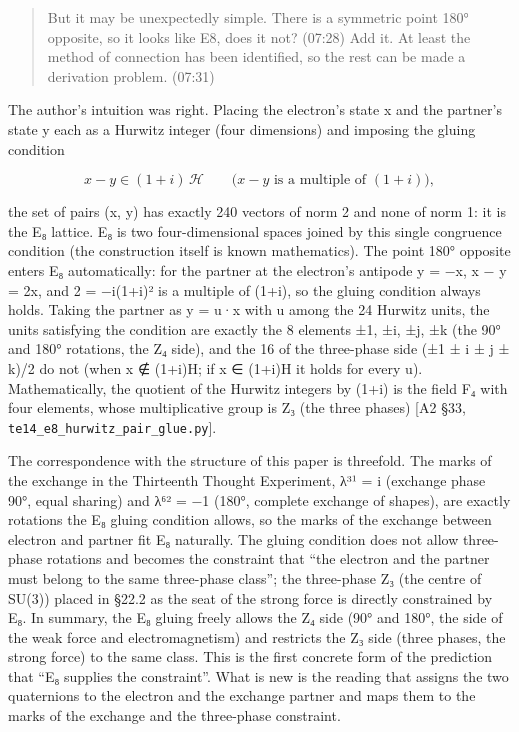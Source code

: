 \documentclass[
  a4paper,
]{article}
\newcounter{none} %
\begin{document}
\begin{quote}
But it may be unexpectedly simple. There is a symmetric point 180°
opposite, so it looks like E8, does it not? (07:28) Add it. At least the
method of connection has been identified, so the rest can be made a
derivation problem. (07:31)
\end{quote}

The author's intuition was right. Placing the electron's state x and the
partner's state y each as a Hurwitz integer (four dimensions) and
imposing the gluing condition

\[
x-y\in(1+i)\,\mathcal H\qquad\text{(}x-y\text{ is a multiple of }(1+i)\text{)},
\]

the set of pairs (x, y) has exactly 240 vectors of norm 2 and none of
norm 1: it is the E₈ lattice. E₈ is two four-dimensional spaces joined
by this single congruence condition (the construction itself is known
mathematics). The point 180° opposite enters E₈ automatically: for the
partner at the electron's antipode y = −x, x − y = 2x, and 2 = −i(1+i)²
is a multiple of (1+i), so the gluing condition always holds. Taking the
partner as y = u·x with u among the 24 Hurwitz units, the units
satisfying the condition are exactly the 8 elements ±1, ±i, ±j, ±k (the
90° and 180° rotations, the Z₄ side), and the 16 of the three-phase side
(±1 ± i ± j ± k)/2 do not (when x ∉ (1+i)H; if x ∈ (1+i)H it holds for
every u). Mathematically, the quotient of the Hurwitz integers by (1+i)
is the field F₄ with four elements, whose multiplicative group is Z₃
(the three phases) {[}A2 §33,
\texttt{te14\_\allowbreak{}e8\_\allowbreak{}hurwitz\_\allowbreak{}pair\_\allowbreak{}glue.py}{]}.

The correspondence with the structure of this paper is threefold. The
marks of the exchange in the Thirteenth Thought Experiment, λ³¹ = i
(exchange phase 90°, equal sharing) and λ⁶² = −1 (180°, complete
exchange of shapes), are exactly rotations the E₈ gluing condition
allows, so the marks of the exchange between electron and partner fit E₈
naturally. The gluing condition does not allow three-phase rotations and
becomes the constraint that ``the electron and the partner must belong
to the same three-phase class''; the three-phase Z₃ (the centre of
SU(3)) placed in §22.2 as the seat of the strong force is directly
constrained by E₈. In summary, the E₈ gluing freely allows the Z₄ side
(90° and 180°, the side of the weak force and electromagnetism) and
restricts the Z₃ side (three phases, the strong force) to the same
class. This is the first concrete form of the prediction that ``E₈
supplies the constraint''. What is new is the reading that assigns the
two quaternions to the electron and the exchange partner and maps them
to the marks of the exchange and the three-phase constraint.
\end{document}
